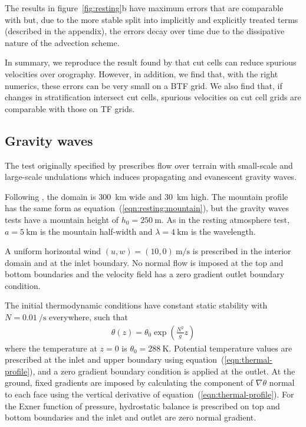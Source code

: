 \documentclass{ametsoc}
\begin{document}
The results in figure~\ref{fig:resting}b have maximum errors that are comparable with \citet{weller-shahrokhi2014} but, due to the more stable split into implicitly and explicitly treated terms (described in the appendix), the errors decay over time due to the dissipative nature of the advection scheme.

In summary, we reproduce the result found by \citet{good2014} that cut cells can reduce spurious velocities over orography.  However, in addition, we find that, with the right numerics, these errors can be very small on a BTF grid.  We also find that, if changes in stratification intersect cut cells, spurious velocities on cut cell grids are comparable with those on TF grids.


\subsection{Gravity waves}
\label{sec:gw}
The test originally specified by \citet{schaer2002} prescribes flow over terrain with small-scale and large-scale undulations which induces propagating and evanescent gravity waves.

Following \citet{melvin2010}, the domain is \SI{300}{\kilo\meter} wide and \SI{30}{\kilo\meter} high.
The mountain profile has the same form as equation~(\ref{eqn:resting:mountain}), but the gravity waves tests have a mountain height of $h_0 = \SI{250}{\meter}$.  As in the resting atmosphere test, $a = \SI{5}{\kilo\meter}$ is the mountain half-width and $\lambda = \SI{4}{\kilo\meter}$ is the wavelength.

A uniform horizontal wind $(u, w) = (10, 0)\:\si{\meter\per\second}$ is prescribed in the interior domain and at the inlet boundary.  No normal flow is imposed at the top and bottom boundaries and the velocity field has a zero gradient outlet boundary condition.

The initial thermodynamic conditions have constant static stability with $N = \SI{0.01}{\per\second}$ everywhere, such that
\begin{align}
	\theta(z) = \theta_0 \exp \left( \frac{N^2}{g} z \right) \label{eqn:thermal-profile}
\end{align}
where the temperature at $z=0$ is $\theta_0 = \SI{288}{\kelvin}$.
Potential temperature values are prescribed at the inlet and upper boundary using equation~(\ref{eqn:thermal-profile}), and a zero gradient boundary condition is applied at the outlet.  At the ground, fixed gradients are imposed by calculating the component of $\nabla \theta$ normal to each face using the vertical derivative of equation~(\ref{eqn:thermal-profile}).
For the Exner function of pressure, hydrostatic balance is prescribed on top and bottom boundaries and the inlet and outlet are zero normal gradient.
\end{document}
